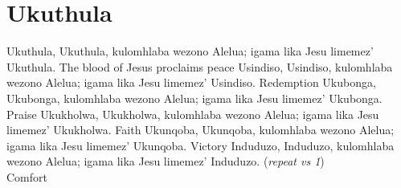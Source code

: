 \starttocol
\chapter{Ukuthula}
\nexttocol
\hfill{\it }
\stoptocol
\starttocol
\startlines
{\sc Ukuthula}, Ukuthula,
kulomhlaba wezono
Alelua;	igama lika Jesu limemez'
Ukuthula.
\stoplines
\nexttocol
The blood of Jesus proclaims peace
\stoptocol
\starttocol
\startlines
Usindiso, Usindiso,
kulomhlaba wezono
Alelua;	igama lika Jesu limemez'
Usindiso.
\stoplines
\nexttocol
Redemption
\stoptocol
\starttocol
\startlines
Ukubonga, Ukubonga,
kulomhlaba wezono
Alelua;	igama lika Jesu limemez'
Ukubonga.
\stoplines
\nexttocol
Praise
\stoptocol
\starttocol
\startlines
Ukukholwa, Ukukholwa,
kulomhlaba wezono
Alelua;	igama lika Jesu limemez'
Ukukholwa.
\stoplines
\nexttocol
Faith
\stoptocol
\starttocol
\startlines
Ukunqoba, Ukunqoba,
kulomhlaba wezono
Alelua;	igama lika Jesu limemez'
Ukunqoba.
\stoplines
\nexttocol
Victory
\stoptocol
\starttocol
\startlines
Induduzo, Induduzo,
kulomhlaba wezono
Alelua;	igama lika Jesu limemez'
Induduzo.
          \hfill({\it repeat vs 1})~~~~~~~~~
\stoplines
\nexttocol
Comfort
\stoptocol
